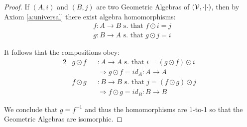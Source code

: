 \begin{proof}
	If $(A, i)$ and $(B, j)$ are two Geometric Algebras of $(\mathcal{V}, \cdot|\cdot)$, then by Axiom \ref{a:universal} there exist algebra homomorphisms:
	\begin{align*}
		&f: A \to B \text{ s. that } f \odot i = j \\
		&g: B \to A \text{ s. that } g \odot j = i
	\end{align*}

	It follows that the compositions obey:
	\begin{alignat*}{2}
		&g \odot f&&: A \to A \text{ s. that } i = (g \odot f) \odot i \\
		& &&\Rightarrow g \odot f = id_A : A \to A \\
		&f \odot g&&: B \to B \text{ s. that } j = (f \odot g) \odot j \\
		& &&\Rightarrow f \odot g = id_B : B \to B
	\end{alignat*}

	We conclude that $g = f^{-1}$ and thus the homomorphisms are 1-to-1 so that the Geometric Algebras are isomorphic.
\end{proof}
